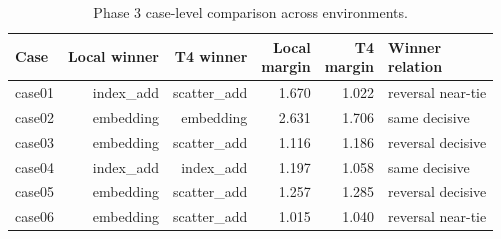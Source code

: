 \begin{table}[!htbp]
\centering
\small
\caption{Phase 3 case-level comparison across environments.}
\label{tab:phase3-case-comparison}
\setlength{\tabcolsep}{3pt}
\renewcommand{\arraystretch}{1.12}
\begin{tabular}{lrrrrl}
\toprule
Case & Local winner & T4 winner & \shortstack{Local\\margin} & \shortstack{T4\\margin} & \shortstack{Winner\\relation} \\
\midrule
case01 & index\_add & scatter\_add & 1.670 & 1.022 & reversal near-tie \\
case02 & embedding & embedding & 2.631 & 1.706 & same decisive \\
case03 & embedding & scatter\_add & 1.116 & 1.186 & reversal decisive \\
case04 & index\_add & index\_add & 1.197 & 1.058 & same decisive \\
case05 & embedding & scatter\_add & 1.257 & 1.285 & reversal decisive \\
case06 & embedding & scatter\_add & 1.015 & 1.040 & reversal near-tie \\
\bottomrule
\end{tabular}
\end{table}